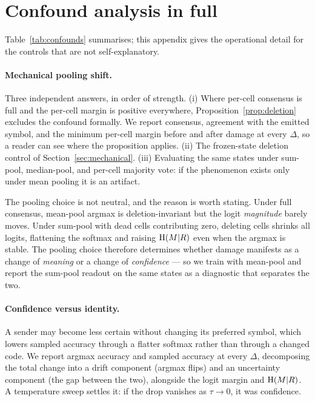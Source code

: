 \section{Confound analysis in full}
\label{app:confounds}

Table~\ref{tab:confounds} summarises; this appendix gives the operational detail
for the controls that are not self-explanatory.

\paragraph{Mechanical pooling shift.} Three independent answers, in order of
strength. (i) Where per-cell consensus is full and the per-cell margin is
positive everywhere, Proposition~\ref{prop:deletion} excludes the confound
formally. We report consensus, agreement with the emitted symbol, and the minimum
per-cell margin before and after damage at every $\Delta$, so a reader can see
where the proposition applies. (ii) The frozen-state deletion control of
Section~\ref{sec:mechanical}. (iii) Evaluating the same states under sum-pool,
median-pool, and per-cell majority vote: if the phenomenon exists only under mean
pooling it is an artifact.

The pooling choice is not neutral, and the reason is worth stating. Under full
consensus, mean-pool argmax is deletion-invariant but the logit \emph{magnitude}
barely moves. Under sum-pool with dead cells contributing zero, deleting cells
shrinks all logits, flattening the softmax and raising $\mathrm{H}(M|R)$ even when the
argmax is stable. The pooling choice therefore determines whether damage
manifests as a change of \emph{meaning} or a change of \emph{confidence} --- so
we train with mean-pool and report the sum-pool readout on the same states as a
diagnostic that separates the two.

\paragraph{Confidence versus identity.} A sender may become less certain without
changing its preferred symbol, which lowers sampled accuracy through a flatter
softmax rather than through a changed code. We report argmax accuracy and sampled
accuracy at every $\Delta$, decomposing the total change into a drift component
(argmax flips) and an uncertainty component (the gap between the two), alongside
the logit margin and $\mathrm{H}(M|R)$. A temperature sweep settles it: if the drop
vanishes as $\tau \to 0$, it was confidence.

